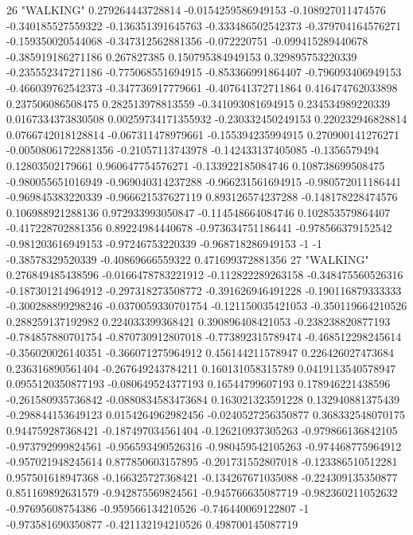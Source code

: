 26 "WALKING" 0.279264443728814 -0.0154259586949153 -0.108927011474576 -0.340185527559322 -0.136351391645763 -0.333486502542373 -0.379704164576271 -0.159350020544068 -0.347312562881356 -0.072220751 -0.099415289440678 -0.385919186271186 0.267827385 0.150795384949153 0.329895753220339 -0.235552347271186 -0.775068551694915 -0.853366991864407 -0.796093406949153 -0.466039762542373 -0.347736917779661 -0.407641372711864 0.416474762033898 0.237506086508475 0.282513978813559 -0.341093081694915 0.234534989220339 0.0167334373830508 0.00259734171355932 -0.230332450249153 0.220232946828814 0.0766742018128814 -0.067311478979661 -0.155394235994915 0.270900141276271 -0.00508061722881356 -0.21057113743978 -0.142433137405085 -0.1356579494 0.12803502179661 0.960647754576271 -0.133922185084746 0.108738699508475 -0.980055651016949 -0.969040314237288 -0.966231561694915 -0.980572011186441 -0.969845383220339 -0.966621537627119 0.893126574237288 -0.148178228474576 0.106988921288136 0.972933993050847 -0.114548664084746 0.102853579864407 -0.417228702881356 0.89224984440678 -0.973634751186441 -0.978566379152542 -0.981203616949153 -0.97246753220339 -0.968718286949153 -1 -1 -0.38578329520339 -0.40869666559322 0.471699372881356
27 "WALKING" 0.276849485438596 -0.0166478783221912 -0.112822289263158 -0.348475560526316 -0.187301214964912 -0.297318273508772 -0.391626946491228 -0.190116879333333 -0.300288899298246 -0.0370059330701754 -0.121150035421053 -0.350119664210526 0.288259137192982 0.224033399368421 0.390896408421053 -0.238238820877193 -0.784857880701754 -0.870730912807018 -0.773892315789474 -0.468512298245614 -0.356020026140351 -0.366071275964912 0.456144211578947 0.226426027473684 0.236316890561404 -0.267649243784211 0.160131058315789 0.0419113540578947 0.0955120350877193 -0.080649524377193 0.16544799607193 0.178946221438596 -0.261580935736842 -0.0880834583473684 0.163021323591228 0.132940881375439 -0.298844153649123 0.0154264962982456 -0.0240527256350877 0.368332548070175 0.944759287368421 -0.187497034561404 -0.126210937305263 -0.979866136842105 -0.973792999824561 -0.956593490526316 -0.980459542105263 -0.974468775964912 -0.957021948245614 0.877850603157895 -0.201731552807018 -0.123386510512281 0.957501618947368 -0.166325727368421 -0.134267671035088 -0.224309135350877 0.851169892631579 -0.942875569824561 -0.945766635087719 -0.982360211052632 -0.97695608754386 -0.959566134210526 -0.746440069122807 -1 -0.973581690350877 -0.421132194210526 0.498700145087719
